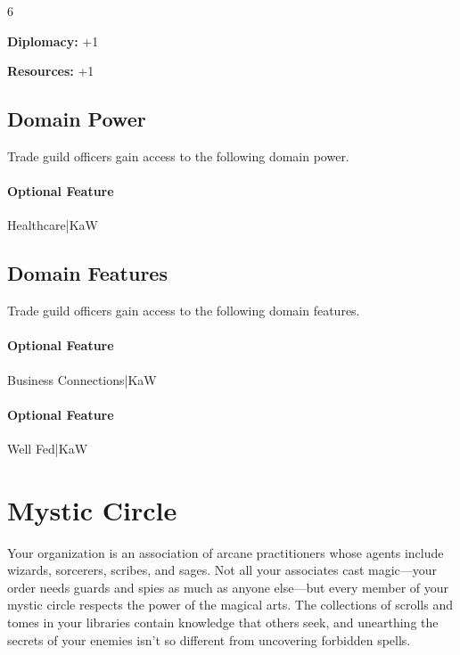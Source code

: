 \documentclass[10pt,a4paper,twoside,bg=print,twocolumn,openany,nodeprecatedcode]{dndbook}
\begin{document}
{\par \vspace { 9pt plus 3pt minus 3pt } \noindent  {} \nopagebreak }

\begin{itemize}
\begin{multicols}{6}
\item \textbf{Diplomacy:} +1
\item \textbf{Resources:} +1
\end{multicols}

\end{itemize}

\subsection{Domain Power}
Trade guild officers gain access to the following domain power.

\paragraph{Optional Feature}
Healthcare|KaW

\subsection{Domain Features}
Trade guild officers gain access to the following domain features.

\paragraph{Optional Feature}
Business Connections|KaW

\paragraph{Optional Feature}
Well Fed|KaW

\section{Mystic Circle}
Your organization is an association of arcane practitioners whose agents include wizards, sorcerers, scribes, and sages. Not all your associates cast magic—your order needs guards and spies as much as anyone else—but every member of your mystic circle respects the power of the magical arts. The collections of scrolls and tomes in your libraries contain knowledge that others seek, and unearthing the secrets of your enemies isn't so different from uncovering forbidden spells.
\end{document}
